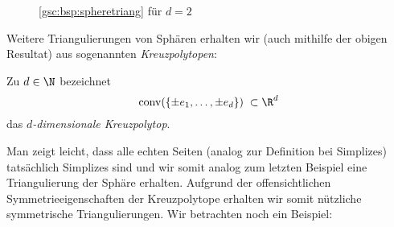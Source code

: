 \begin{figure}
    \centering
    \caption{\cref{gsc:bsp:spheretriang} für $d=2$}
    \label{gsc:fig:spheretriang}
\end{figure}

Weitere Triangulierungen von Sphären erhalten wir (auch mithilfe der obigen
Resultat) aus sogenannten \emph{Kreuzpolytopen}:

\begin{thDef}[Kreuzpolytop]
    Zu $d\in\N$ bezeichnet
    \[ \conv(\{ \pm e_1, \ldots, \pm e_d \}) \;\subset\R^d \]
    das \emph{$d$-dimensionale Kreuzpolytop}.
\end{thDef}


Man zeigt leicht, dass alle echten Seiten (analog zur Definition bei Simplizes)
tatsächlich Simplizes sind und wir somit analog zum letzten Beispiel eine
Triangulierung der Sphäre erhalten. Aufgrund der offensichtlichen
Symmetrieeigenschaften der Kreuzpolytope erhalten wir somit nützliche symmetrische
Triangulierungen. Wir betrachten noch ein Beispiel:

